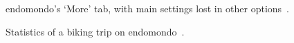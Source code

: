 \begin{figure}[htb!]
    \centering
        \caption{endomondo's `More' tab, with main settings lost in other options~\cite{endomondo-more-tab}.}
        \label{endomondo-more-tab}
\end{figure}

\begin{figure}[htb!]
    \centering
        \caption{Statistics of a biking trip on endomondo~\cite{endomondo-bike-stats-img}.}
\end{figure}

